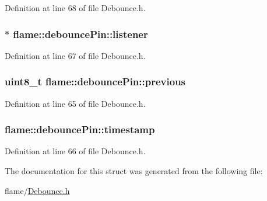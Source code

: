 Definition at line 68 of file Debounce.\-h.

\hypertarget{structflame_1_1debounce_pin_a9af0c2b0919f7876d1c1826aca106bc6}{
\subsubsection[{listener}]{$\ast$ flame\-::debounce\-Pin\-::listener}}\label{structflame_1_1debounce_pin_a9af0c2b0919f7876d1c1826aca106bc6}


Definition at line 67 of file Debounce.\-h.

\hypertarget{structflame_1_1debounce_pin_af3f18f9d280894adfcf12294b296c108}{
\subsubsection[{previous}]{\setlength{\rightskip}{0pt plus 5cm}uint8\-\_\-t flame\-::debounce\-Pin\-::previous}}\label{structflame_1_1debounce_pin_af3f18f9d280894adfcf12294b296c108}


Definition at line 65 of file Debounce.\-h.

\hypertarget{structflame_1_1debounce_pin_ad10be4149c4882c6e767ad3460b6a5c9}{
\subsubsection[{timestamp}]{ flame\-::debounce\-Pin\-::timestamp}}\label{structflame_1_1debounce_pin_ad10be4149c4882c6e767ad3460b6a5c9}


Definition at line 66 of file Debounce.\-h.



The documentation for this struct was generated from the following file\-:\begin{DoxyCompactItemize}
\item 
flame/\hyperlink{_debounce_8h}{Debounce.\-h}\end{DoxyCompactItemize}
